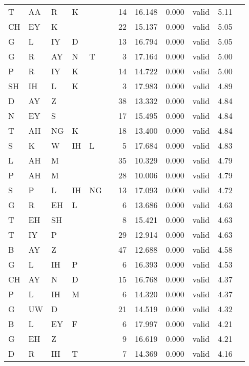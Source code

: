 \begin{longtable}{l@{ } l@{ } l@{ } l@{ } l@{ } l r r r r r r}
T  & AA & R  & K  &    &   & 14 & 16.148 & 0.000 & valid   & 5.11 \\
CH & EY & K  &    &    &   & 22 & 15.137 & 0.000 & valid   & 5.05 \\
G  & L  & IY & D  &    &   & 13 & 16.794 & 0.000 & valid   & 5.05 \\
G  & R  & AY & N  & T  &   &  3 & 17.164 & 0.000 & valid   & 5.00 \\
P  & R  & IY & K  &    &   & 14 & 14.722 & 0.000 & valid   & 5.00 \\
SH & IH & L  & K  &    &   &  3 & 17.983 & 0.000 & valid   & 4.89 \\
D  & AY & Z  &    &    &   & 38 & 13.332 & 0.000 & valid   & 4.84 \\
N  & EY & S  &    &    &   & 17 & 15.495 & 0.000 & valid   & 4.84 \\
T  & AH & NG & K  &    &   & 18 & 13.400 & 0.000 & valid   & 4.84 \\
S  & K  & W  & IH & L  &   &  5 & 17.684 & 0.000 & valid   & 4.83 \\
L  & AH & M  &    &    &   & 35 & 10.329 & 0.000 & valid   & 4.79 \\
P  & AH & M  &    &    &   & 28 & 10.006 & 0.000 & valid   & 4.79 \\
S  & P  & L  & IH & NG &   & 13 & 17.093 & 0.000 & valid   & 4.72 \\
G  & R  & EH & L  &    &   &  6 & 13.686 & 0.000 & valid   & 4.63 \\
T  & EH & SH &    &    &   &  8 & 15.421 & 0.000 & valid   & 4.63 \\
T  & IY & P  &    &    &   & 29 & 12.914 & 0.000 & valid   & 4.63 \\
B  & AY & Z  &    &    &   & 47 & 12.688 & 0.000 & valid   & 4.58 \\
G  & L  & IH & P  &    &   &  6 & 16.393 & 0.000 & valid   & 4.53 \\
CH & AY & N  & D  &    &   & 15 & 16.768 & 0.000 & valid   & 4.37 \\
P  & L  & IH & M  &    &   &  6 & 14.320 & 0.000 & valid   & 4.37 \\
G  & UW & D  &    &    &   & 21 & 14.519 & 0.000 & valid   & 4.32 \\
B  & L  & EY & F  &    &   &  6 & 17.997 & 0.000 & valid   & 4.21 \\
G  & EH & Z  &    &    &   &  9 & 16.619 & 0.000 & valid   & 4.21 \\
D  & R  & IH & T  &    &   &  7 & 14.369 & 0.000 & valid   & 4.16 \\

\end{longtable}
